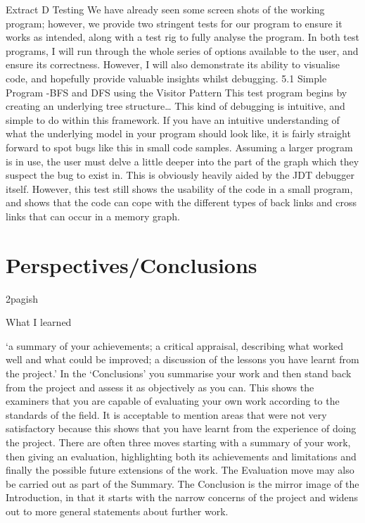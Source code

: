 \documentclass[12pt]{article}
\let\stdsection\section
\renewcommand\section{\newpage\stdsection}
\begin{document}
Extract D Testing 
We have already seen some screen shots of the working program; however, we provide two stringent tests 
for our program to ensure it works as intended, along with a test rig to fully analyse the program. In both test 
programs, I will run through the whole series of options available to the user, and ensure its correctness. 
However, I will also demonstrate its ability to visualise code, and hopefully provide valuable insights whilst 
debugging. 
5.1 Simple Program -BFS and DFS using the Visitor Pattern
This test program begins by creating an underlying tree structure…
This kind of debugging is intuitive, and simple to do within this framework. If you have an intuitive 
understanding of what the underlying model in your program should look like, it is fairly straight forward to 
spot bugs like this in  small code samples. Assuming a larger program is in use, the user must delve a little 
deeper into the part of the graph which they suspect the bug to exist in. This is obviously heavily aided by the 
JDT debugger itself. However, this test still shows the usability of the code in a small program, and shows 
that the code can cope with the different types of back links and cross links that can occur in a memory 
graph.

\section{Perspectives/Conclusions}
2pagish

What I learned

‘a summary of your achievements; a critical appraisal, describing what worked well and what could be 
improved; a discussion of the lessons you have learnt from the project.’
In the ‘Conclusions’ you summarise your work and then stand back from the project and assess it as 
objectively as you can. This shows the examiners that you are capable of evaluating your own work 
according to the standards of the field. It is acceptable to mention areas that were not very satisfactory
because this shows that you have learnt from the experience of doing the project.
There are often three moves starting with a summary of your work, then giving an evaluation, highlighting
both its achievements and limitations and finally the possible future extensions of the work. The Evaluation 
move may also be carried out as part of the Summary. The Conclusion is the mirror image of the 
Introduction, in that it starts with the narrow concerns of the project and widens out to more general 
statements about further work.
\end{document}
